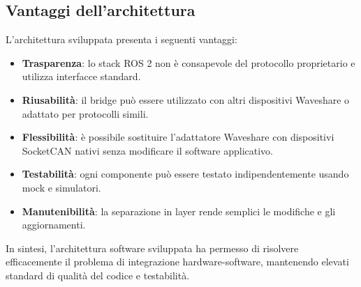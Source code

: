 \subsection{Vantaggi dell'architettura}

L'architettura sviluppata presenta i seguenti vantaggi:

\begin{itemize}
    \item \textbf{Trasparenza}: lo stack ROS 2 non è consapevole del protocollo proprietario e utilizza interfacce standard.
    \item \textbf{Riusabilità}: il bridge può essere utilizzato con altri dispositivi Waveshare o adattato per protocolli simili.
    \item \textbf{Flessibilità}: è possibile sostituire l'adattatore Waveshare con dispositivi SocketCAN nativi senza modificare il software applicativo.
    \item \textbf{Testabilità}: ogni componente può essere testato indipendentemente usando mock e simulatori.
    \item \textbf{Manutenibilità}: la separazione in layer rende semplici le modifiche e gli aggiornamenti.
\end{itemize}

In sintesi, l'architettura software sviluppata ha permesso di risolvere efficacemente il problema di integrazione hardware-software, mantenendo elevati standard di qualità del codice e testabilità.